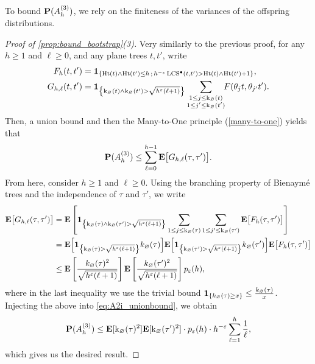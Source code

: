 \documentclass[11pt,reqno]{amsart}
\newcommand{\Ht}{\mathrm{Ht}}
\newcommand{\rk}{\mathrm{k}}
\newcommand{\LCS}{\operatorname{LCS}}
\renewcommand{\emptyset}{\varnothing}
\begin{document}
To bound $\mathbf{P}(A_h^{(3)})$, we rely on the finiteness of the variances of the offspring distributions.

\begin{proof}[Proof of \cref{prop:bound_bootstrap}(3)]
    Very similarly to the previous proof, for any $h\geq 1$ and $\ell\geq 0$, and any plane trees $t,t'$, write
    \begin{align*}
        F_{h}(t,t')&=\I{\Ht(t)\wedge \Ht(t')\leq h\, ;\, h^{-\varepsilon}\LCS^\bullet(t,t')> \Ht(t)\wedge\Ht(t')+1},\\
        G_{h,\ell}(t,t')&=\I{\rk_\varnothing(t)\wedge \rk_\varnothing(t')>\sqrt{h^\varepsilon(\ell+1)}}\sum_{\substack{1 \leq j \leq \rk_\emptyset(t) \\ 1 \leq  j' \leq \rk_{\emptyset}(t')}}\!\!  F(\theta_j t,\theta_{j'}t').
    \end{align*}
    Then, a union bound and then the Many-to-One principle (\cref{many-to-one}) yields that
    \begin{equation}\label{eq:A2i_unionbound}
        \mathbf{P}(A_h^{(3)}) \leq \sum_{\ell = 0}^{h-1} {\mathbf E}\big[G_{h,\ell}(\tau,\tau')\big].
    \end{equation}
    From here, consider $h\geq 1$ and $\ell\geq 0$. Using the branching property of Bienaym\'{e} trees and the independence of $\tau$ and $\tau'$, we write
    \begin{align*}
    \E\big[G_{h,\ell}(\tau,\tau')\big] &= \ex\left[ \I{\rk_\varnothing(\tau)\wedge \rk_\varnothing(\tau')>\sqrt{h^\varepsilon(\ell+1)}}\sum_{1 \leq j \leq \rk_\emptyset(\tau)}\sum_{1 \leq j' \leq \rk_\emptyset(\tau')} \E\big[F_h(\tau,\tau')\big] \right] \\
    &= \E\Big[\I{\rk_\varnothing(\tau)>\sqrt{h^\varepsilon(\ell+1)}}k_\varnothing(\tau)\Big] \E\Big[\I{\rk_\varnothing(\tau')>\sqrt{h^\varepsilon(\ell+1)}}k_\varnothing(\tau')\Big] \E\big[F_h(\tau,\tau')\big]\\
    &\leq \ex\left[ \frac{k_\emptyset(\tau)^2}{\sqrt{h^\varepsilon (\ell+1)}} \right] \ex\left[ \frac{k_\emptyset(\tau')^2}{\sqrt{h^\varepsilon (\ell+1)}} \right] p_\varepsilon(h),
    \end{align*}
    where in the last inequality we use the trivial bound $\I{k_\emptyset(\tau) \geq x} \leq \frac{k_\emptyset(\tau)}{x}$. Injecting the above into \eqref{eq:A2i_unionbound}, we obtain
    $$
    \prob(A_h^{(3)}) \leq \ex[\rk_\emptyset(\tau)^2]\ex[\rk_\emptyset(\tau')^2]\cdot  p_\varepsilon(h)\cdot h^{-\varepsilon}\sum_{\ell = 1}^{h} \frac{1}{\ell},
    $$
    which gives us the desired result.
\end{proof}
\end{document}
